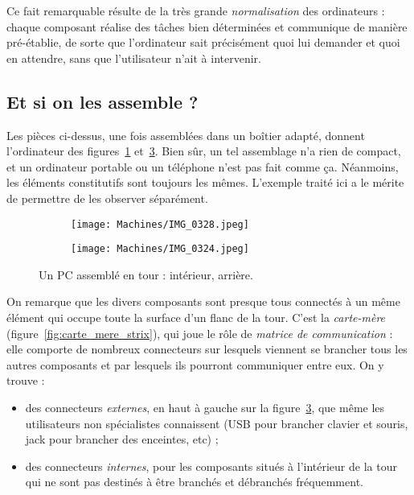 Ce fait remarquable résulte de la très grande \emph{normalisation} des ordinateurs : chaque composant réalise des tâches bien déterminées et communique de manière pré-établie, de sorte que l'ordinateur sait précisément quoi lui demander et quoi en attendre, sans que l'utilisateur n'ait à intervenir.
\subsection{Et si on les assemble ?}
Les pièces ci-dessus, une fois assemblées dans un boîtier adapté, donnent l'ordinateur des figures~\ref{fig:tour1} et~\ref{fig:tour2}. Bien sûr, un tel assemblage n'a rien de compact, et un ordinateur portable ou un téléphone n'est pas fait comme ça. Néanmoins, les éléments constitutifs sont toujours les mêmes. L'exemple traité ici a le mérite de permettre de les observer séparément.
\begin{figure}[!htb]
\centering
	\begin{subfigure}[b]{0.55\textwidth}
	\centering
	\texttt{[image: Machines/IMG\_0328.jpeg]}
	\caption{\label{fig:tour1}}
	\end{subfigure}
\quad
	\begin{subfigure}[b]{0.35\textwidth}
	\centering
	\texttt{[image: Machines/IMG\_0324.jpeg]}
	\caption{\label{fig:tour2}}
	\end{subfigure}
\caption{Un PC assemblé en tour : \protect{} intérieur, \protect{} arrière.}
\end{figure}
On remarque que les divers composants sont presque tous connectés à un même élément qui occupe toute la surface d'un flanc de la tour. C'est la \emph{carte-mère} (figure~\ref{fig:carte_mere_strix}), qui joue le rôle de \emph{matrice de communication} : elle comporte de nombreux connecteurs sur lesquels viennent se brancher tous les autres composants et par lesquels ils pourront communiquer entre eux. On y trouve :
	\begin{itemize}
	\item des connecteurs \emph{externes}, en haut à gauche sur la figure~\ref{fig:tour2}, que même les utilisateurs non spécialistes connaissent (USB pour brancher clavier et souris, jack pour brancher des enceintes, etc) ;
	\item des connecteurs \emph{internes}, pour les composants situés à l'intérieur de la tour qui ne sont pas destinés à être branchés et débranchés fréquemment.
	\end{itemize}
